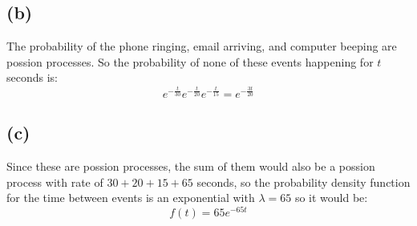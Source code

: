 \subsection*{(b)}
The probability of the phone ringing, email arriving, and computer beeping
are possion processes. So the probability of none of these events happening for 
$t$ seconds is:
$$e^{-\frac{t}{30}}e^{-\frac{t}{20}}e^{-\frac{t}{15}}=\boxed{e^{-\frac{3t}{20}}}$$
\subsection*{(c)}
Since these are possion processes, the sum of them would also be a possion process
with rate of $30+20+15+65$ seconds, so the probability density function 
for the time between events is an exponential with $\lambda=65$ so it would be:
$$\boxed{f(t)=65e^{-65t}}$$

